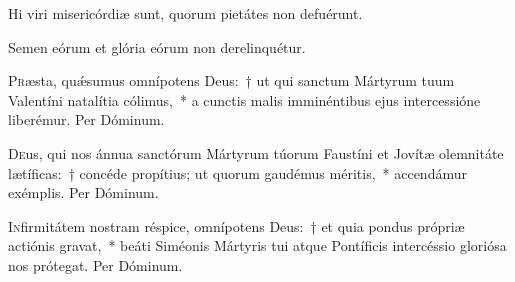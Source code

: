 \documentclass[vesperale_romanum.tex]{subfiles}
\begin{document}

\vv Hi viri misericórdiæ sunt, quorum pietátes non defuérunt.

\rr Semen eórum et glória eórum non derelinquétur.

\admagnificat


\quadcommferiae

\myrule



\oratio

\lettrine{P}{r}æsta, quǽsumus omnípotens Deus:~† ut qui san\-ctum Mártyrum tuum Valentíni natalítia cólimus,~* a cun\-ctis malis imminéntibus ejus intercessióne liberémur. Per Dóminum.

\myrule



\oratio

\lettrine{D}{e}us, qui nos ánnua san\-ctórum Mártyrum túorum Faustíni et Jovítæ ole\-mnitáte lætíficas:~† concéde propítius; ut quorum gaudémus méritis,~* accendámur exémplis. Per Dóminum.

\myrule
\newpage



\oratio

\lettrine{I}{n}firmitátem nostram réspice, omnípotens Deus:~† et quia pondus própriæ actiónis gravat,~* beáti Siméonis Mártyris tui atque Pontíficis intercéssio gloriósa nos prótegat. Per Dóminum.

\myrule
{}

\duplexmajus


\end{document}
